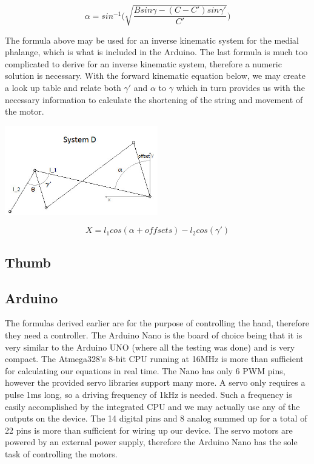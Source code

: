 \documentclass{article}
\begin{document}
\[ \alpha = sin^{-1} \bigg( \sqrt{\frac{Bsin\gamma-(C-C')sin\gamma'}{C'}} \bigg) \]

The formula above may be used for an inverse kinematic system for the medial phalange, which is what is included in the Arduino. The last formula is much too complicated to derive for an inverse kinematic system, therefore a numeric solution is necessary. With the forward kinematic equation below, we may create a look up table and relate both $\gamma'$ and $\alpha$ to $\gamma$ which in turn provides us with the necessary information to calculate the shortening of the string and movement of the motor.

\begin{center}
\includegraphics[width=0.5\textwidth]{IMG/IK_05.jpeg}
\end{center}


\[ X = l_1 cos(\alpha+offsets) - l_2 cos(\gamma') \]


\subsection{Thumb}

\subsection{Arduino}
The formulas derived earlier are for the purpose of controlling the hand, therefore they need a controller. The Arduino Nano is the board of choice being that it is very similar to the Arduino UNO (where all the testing was done) and is very compact. The Atmega328's 8-bit CPU running at 16MHz is more than sufficient for calculating our equations in real time. The Nano has only 6 PWM pins, however the provided servo libraries support many more. A servo only requires a pulse 1ms long, so a driving frequency of 1kHz is needed. Such a frequency is easily accomplished by the integrated CPU and we may actually use any of the outputs on the device. The 14 digital pins and 8 analog summed up for a total of 22 pins is more than sufficient for wiring up our device. The servo motors are powered by an external power supply, therefore the Arduino Nano has the sole task of controlling the motors.
\end{document}

